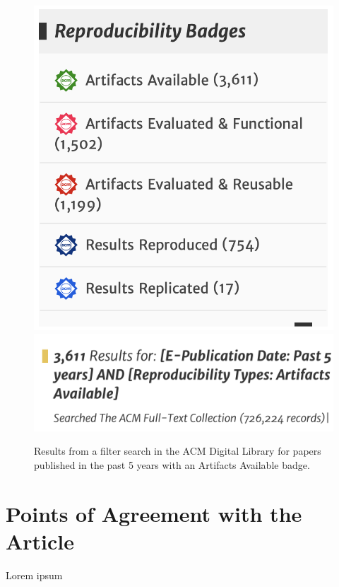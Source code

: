 \documentclass[]{hdsr}
\begin{document}
\begin{figure}
    \centering
    \includegraphics[scale=0.5]{acm_badges_5years-a} \\
    \includegraphics[scale=0.5]{acm_badges_5years-b} \\
    \caption{Results from a filter search in the ACM Digital Library for papers published in the past 5 years with an Artifacts Available badge.}
    \label{fig:acm_badges_5years}
\end{figure}

\restoregeometry
{}

\section{Points of Agreement with the Article}
Lorem ipsum 
\end{document}
